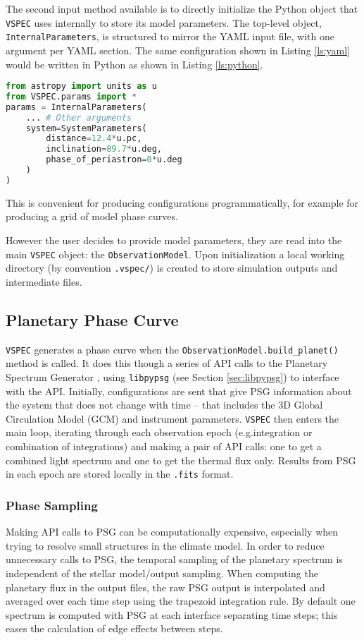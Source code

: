 \documentclass[linenumbers,5p,twocolumn,authoryear]{elsarticle}
\newcommand{\vspec}[1]{\texttt{VSPEC}#1}
\begin{document}
The second input method available is to directly initialize the Python object that \vspec{} uses internally to store its model parameters.
The top-level object, \texttt{InternalParameters}, is structured to mirror the YAML input file, with one argument per YAML section. The same
configuration shown in Listing \ref{ls:yaml} would be written in Python as shown in Listing \ref{ls:python}.
\begin{lstlisting}[language=Python, caption={\vspec{} Python configuration},label={ls:python}]
from astropy import units as u
from VSPEC.params import *
params = InternalParameters(
    ... # Other arguments
    system=SystemParameters(
        distance=12.4*u.pc,
        inclination=89.7*u.deg,
        phase_of_periastron=0*u.deg
    )
)
\end{lstlisting}
This is convenient for producing configurations programmatically, for example for producing a grid of model phase curves.

However the user decides to provide model parameters, they are read into the main \vspec{} object: the \texttt{ObservationModel}.
Upon initialization a local working directory (by convention \texttt{.vspec/}) is created to store simulation outputs and intermediate files.

\subsection{Planetary Phase Curve}
\label{subsec:phase-curve}
\vspec{} generates a phase curve when the \texttt{ObservationModel.build\_planet()} method is called. It does this though a series of API calls to the Planetary Spectrum Generator \citep[PSG][]{villanueva2018}, using \texttt{libpypsg} (see Section \ref{sec:libpypsg}) to interface with the API. Initially, configurations are sent that give PSG information about the system that does not change with time -- that includes the 3D Global Circulation Model (GCM) and instrument parameters. \vspec{} then enters the main loop, iterating through each observation epoch (e.g.integration or combination of integrations) and making a pair of API calls: one to get a combined light spectrum and one to get the thermal flux only. Results from PSG in each epoch are stored locally in the \texttt{.fits} format. 

\subsubsection{Phase Sampling}
Making API calls to PSG can be computationally expensive, especially when trying to resolve small structures in the climate model. In order to reduce unnecessary calls to PSG, the temporal sampling of the planetary spectrum is independent of the stellar model/output sampling. When computing the planetary flux in the output files, the raw PSG output is interpolated and averaged over each time step using the trapezoid integration rule. By default one spectrum is computed with PSG at each interface separating time steps; this eases the calculation of edge effects between steps.
\end{document}
